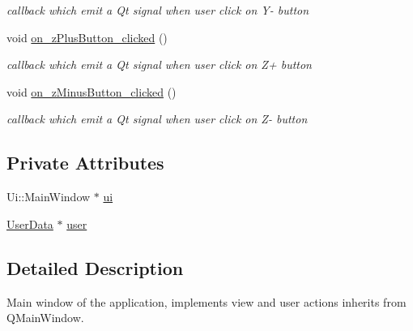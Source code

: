 \begin{DoxyCompactItemize}
\begin{DoxyCompactList}\small\item\em callback which emit a Qt signal when user click on Y-\/ button \end{DoxyCompactList}\item 
\hypertarget{class_main_window_a898da68c8a89a6f3d696eb58efe8020d}{void \hyperlink{class_main_window_a898da68c8a89a6f3d696eb58efe8020d}{on\-\_\-z\-Plus\-Button\-\_\-clicked} ()}\label{class_main_window_a898da68c8a89a6f3d696eb58efe8020d}

\begin{DoxyCompactList}\small\item\em callback which emit a Qt signal when user click on Z+ button \end{DoxyCompactList}\item 
\hypertarget{class_main_window_a6c0c09ab43457ec6458127f012c0657f}{void \hyperlink{class_main_window_a6c0c09ab43457ec6458127f012c0657f}{on\-\_\-z\-Minus\-Button\-\_\-clicked} ()}\label{class_main_window_a6c0c09ab43457ec6458127f012c0657f}

\begin{DoxyCompactList}\small\item\em callback which emit a Qt signal when user click on Z-\/ button \end{DoxyCompactList}\end{DoxyCompactItemize}
\subsection*{Private Attributes}
\begin{DoxyCompactItemize}
\item 
Ui\-::\-Main\-Window $\ast$ \hyperlink{class_main_window_a35466a70ed47252a0191168126a352a5}{ui}
\item 
\hyperlink{class_user_data}{User\-Data} $\ast$ \hyperlink{class_main_window_a5ad62f9757137d68b2b49bae414c4fdd}{user}
\end{DoxyCompactItemize}


\subsection{Detailed Description}
Main window of the application, implements view and user actions inherits from Q\-Main\-Window. 

